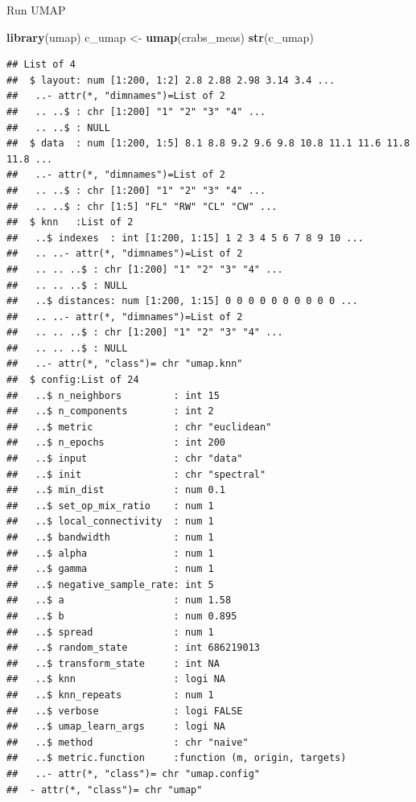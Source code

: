 \documentclass[
]{book}
\newenvironment{Shaded}{\begin{snugshade}}{\end{snugshade}}
\newcommand{\FunctionTok}[1]{\textcolor[rgb]{0.13,0.29,0.53}{\textbf{#1}}}
\newcommand{\NormalTok}[1]{#1}
\newcommand{\OtherTok}[1]{\textcolor[rgb]{0.56,0.35,0.01}{#1}}
\begin{document}
Run UMAP

\begin{Shaded}
\begin{Highlighting}[]
\FunctionTok{library}\NormalTok{(umap)}
\NormalTok{c\_umap }\OtherTok{\textless{}{-}} \FunctionTok{umap}\NormalTok{(crabs\_meas)}
\FunctionTok{str}\NormalTok{(c\_umap)}
\end{Highlighting}
\end{Shaded}

\begin{verbatim}
## List of 4
##  $ layout: num [1:200, 1:2] 2.8 2.88 2.98 3.14 3.4 ...
##   ..- attr(*, "dimnames")=List of 2
##   .. ..$ : chr [1:200] "1" "2" "3" "4" ...
##   .. ..$ : NULL
##  $ data  : num [1:200, 1:5] 8.1 8.8 9.2 9.6 9.8 10.8 11.1 11.6 11.8 11.8 ...
##   ..- attr(*, "dimnames")=List of 2
##   .. ..$ : chr [1:200] "1" "2" "3" "4" ...
##   .. ..$ : chr [1:5] "FL" "RW" "CL" "CW" ...
##  $ knn   :List of 2
##   ..$ indexes  : int [1:200, 1:15] 1 2 3 4 5 6 7 8 9 10 ...
##   .. ..- attr(*, "dimnames")=List of 2
##   .. .. ..$ : chr [1:200] "1" "2" "3" "4" ...
##   .. .. ..$ : NULL
##   ..$ distances: num [1:200, 1:15] 0 0 0 0 0 0 0 0 0 0 ...
##   .. ..- attr(*, "dimnames")=List of 2
##   .. .. ..$ : chr [1:200] "1" "2" "3" "4" ...
##   .. .. ..$ : NULL
##   ..- attr(*, "class")= chr "umap.knn"
##  $ config:List of 24
##   ..$ n_neighbors         : int 15
##   ..$ n_components        : int 2
##   ..$ metric              : chr "euclidean"
##   ..$ n_epochs            : int 200
##   ..$ input               : chr "data"
##   ..$ init                : chr "spectral"
##   ..$ min_dist            : num 0.1
##   ..$ set_op_mix_ratio    : num 1
##   ..$ local_connectivity  : num 1
##   ..$ bandwidth           : num 1
##   ..$ alpha               : num 1
##   ..$ gamma               : num 1
##   ..$ negative_sample_rate: int 5
##   ..$ a                   : num 1.58
##   ..$ b                   : num 0.895
##   ..$ spread              : num 1
##   ..$ random_state        : int 686219013
##   ..$ transform_state     : int NA
##   ..$ knn                 : logi NA
##   ..$ knn_repeats         : num 1
##   ..$ verbose             : logi FALSE
##   ..$ umap_learn_args     : logi NA
##   ..$ method              : chr "naive"
##   ..$ metric.function     :function (m, origin, targets)  
##   ..- attr(*, "class")= chr "umap.config"
##  - attr(*, "class")= chr "umap"
\end{verbatim}
\end{document}
